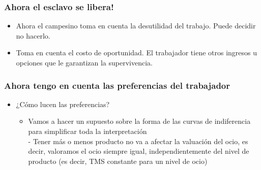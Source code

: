 \documentclass{beamer}
\begin{document}
\begin{frame}
\frametitle{Ahora el esclavo se libera!}
\begin{center}
\begin{figure}[H]
\renewcommand{\figurename}{Figure}
\begin{center}
\end{center}
\end{figure}
\end{center}
\begin{itemize}
    \item Ahora el campesino toma en cuenta la desutilidad del trabajo. Puede decidir no hacerlo.
    \item Toma en cuenta el costo de oportunidad. El trabajador tiene otros ingresos u opciones que le garantizan la supervivencia.
\end{itemize}
\end{frame}


\begin{frame}
\frametitle{Ahora tengo en cuenta las preferencias del trabajador}
\begin{itemize}
        \item ¿Cómo lucen las preferencias? \vspace{2mm}
        \begin{itemize}
            \item Vamos a hacer un supuesto sobre la forma de las curvas de indiferencia para simplificar toda la interpretación \\ \vspace{2mm}
            - Tener más o menos producto no va a afectar la valuación del ocio, es decir, valoramos el ocio siempre igual, independientemente del nivel de producto (es decir, TMS constante para un nivel de ocio)
        \end{itemize}
\end{itemize}
\end{frame}
\end{document}
